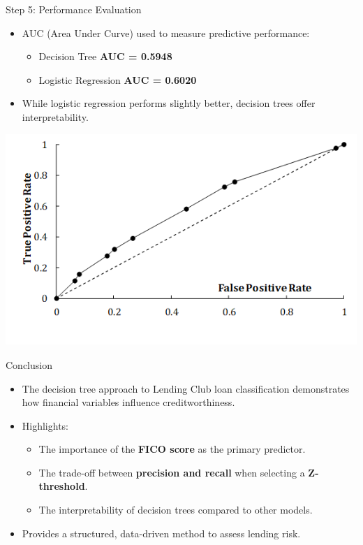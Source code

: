 \documentclass[11pt]{beamer}
\begin{document}
\begin{frame}{Step 5: Performance Evaluation}
    \begin{itemize}
        \item AUC (Area Under Curve) used to measure predictive performance:
        \begin{itemize}
            \item Decision Tree \textbf{AUC = 0.5948}
            \item Logistic Regression \textbf{AUC = 0.6020}
        \end{itemize}
        \item While logistic regression performs slightly better, decision trees offer interpretability.
    \end{itemize}
\begin{center}
	\includegraphics[scale=.5]{../05-pictures/lesson-3-3_pic_8.png}
	\end{center}
\end{frame}
%
%
\begin{frame}{Conclusion}
    \begin{itemize}
        \item The decision tree approach to Lending Club loan classification demonstrates how financial variables influence creditworthiness.
        \item Highlights:
        \begin{itemize}
            \item The importance of the \textbf{FICO score} as the primary predictor.
            \item The trade-off between \textbf{precision and recall} when selecting a \textbf{Z-threshold}.
            \item The interpretability of decision trees compared to other models.
        \end{itemize}
        \item Provides a structured, data-driven method to assess lending risk.
    \end{itemize}
\end{frame}
%
%
\end{document}

